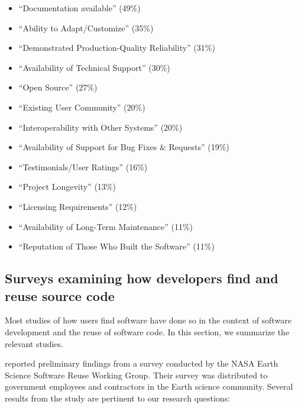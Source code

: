 \documentclass[review]{elsarticle}
\begin{document}
\begin{itemize}
\begin{itemize}[itemsep=0.2ex]
\item ``Documentation available'' (49\%)
\item ``Ability to Adapt/Customize'' (35\%)
\item ``Demonstrated Production-Quality Reliability'' (31\%)
\item ``Availability of Technical Support'' (30\%)
\item ``Open Source'' (27\%)
\item ``Existing User Community'' (20\%)
\item ``Interoperability with Other Systems'' (20\%)
\item ``Availability of Support for Bug Fixes \& Requests'' (19\%)
\item ``Testimonials/User Ratings'' (16\%)
\item ``Project Longevity'' (13\%)
\item ``Licensing Requirements'' (12\%)
\item ``Availability of Long-Term Maintenance'' (11\%)
\item ``Reputation of Those Who Built the Software'' (11\%)
\end{itemize}

\end{itemize}


\subsection{Surveys examining how developers find and reuse source code}
\label{code-search-by-developers}

Most studies of how users find software have done so in the context of software development and the reuse of software code.  In this section, we summarize the relevant studies.

\citet{samadi_2004} reported preliminary findings from a survey conducted by the NASA Earth Science Software Reuse Working Group. Their survey was distributed to government employees and contractors in the Earth science community.  Several results from the study are pertinent to our research questions:
\end{document}
